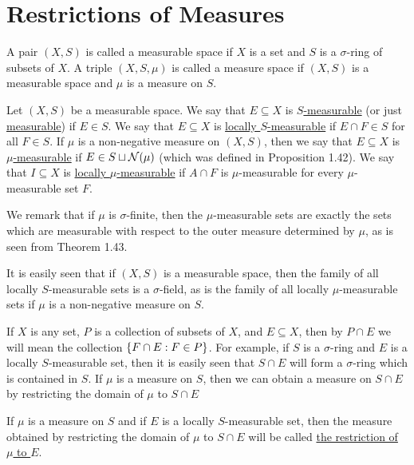 
\section{Restrictions of Measures}

\begin{definition}
A pair $(X,S)$ is called a measurable space if $X$ is a set and $S$ is a $\sigma$-ring of subsets of $X$. A triple $(X,S,\mu)$ is called a measure space if $(X, S)$ is a measurable space and $\mu$ is a measure on $S$.
\end{definition}

\begin{definition}
Let $(X, S)$ be a measurable space. We say that $E \subseteq X$ is \underline{$S$-measurable} (or just \underline{measurable}) if $E \in S$. We say that $E \subseteq X$ is \underline{locally $S$-measurable} if $E\cap F \in S$ for all $F \in S$. If $\mu$ is a non-negative measure on $(X, S)$, then we say that $E \subseteq X$ is \underline{$\mu$-measurable} if $E \in S\sqcup{\cal N}(\mu)$ (which was defined in Proposition 1.42). We say that $I \subseteq X$ is \underline{locally $\mu$-measurable} if $A\cap F$ is $\mu$-measurable for every $\mu$-measurable set $F$.
\end{definition}

We remark that if $\mu$ is $\sigma$-finite, then the $\mu$-measurable sets are exactly the sets which are measurable with respect to the outer measure determined by $\mu$, as is seen from Theorem 1.43.

It is easily seen that if $(X, S)$ is a measurable space, then the family of all locally $S$-measurable sets is a $\sigma$-field, as is the family of all locally $\mu$-measurable sets if $\mu$ is a non-negative measure on $S$.

If $X$ is any set, $P$ is a collection of subsets of $X$, and $E \subseteq X$, then by $P \cap E$ we will mean the collection $\left\{F \cap E: F \in P\right\}$. For example, if $S$ is a $\sigma$-ring and $E$ is a locally $S$-measurable set, then it is easily seen that $S \cap E$ will form a $\sigma$-ring which is contained in $S$. If $\mu$ is a measure on $S$, then we can obtain a measure on $S \cap E$ by restricting the domain of $\mu$ to $S \cap E$

\begin{definition}
If $\mu$ is a measure on $S$ and if $E$ is a locally $S$-measurable set, then the measure obtained by restricting the domain of $\mu$ to $S \cap E$ will be called \underline{the restriction of $\mu$ to $E$}.
\end{definition}

